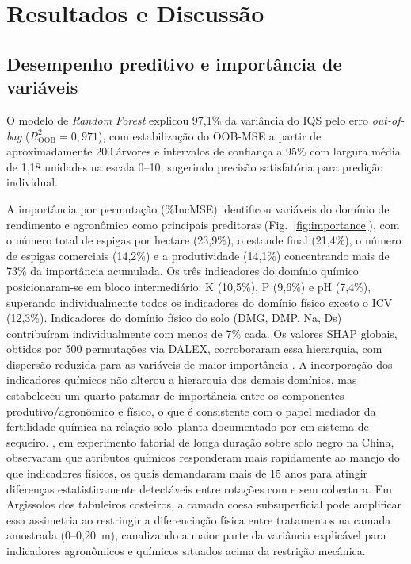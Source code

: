 \documentclass[pdflatex,sn-basic]{sn-jnl}%
\begin{document}
\section{Resultados e Discussão}\label{sec:results_discussion}

\subsection{Desempenho preditivo e importância de variáveis}\label{subsec:performance}

O modelo de \textit{Random Forest} explicou 97,1\% da variância do IQS pelo erro \textit{out-of-bag} ($R^2_{\text{OOB}} = 0{,}971$), com estabilização do OOB-MSE a partir de aproximadamente 200 árvores e intervalos de confiança a 95\% com largura média de 1,18 unidades na escala 0--10, sugerindo precisão satisfatória para predição individual.

A importância por permutação (\%IncMSE) identificou variáveis do domínio de rendimento e agronômico como principais preditoras (Fig.~\ref{fig:importance}), com o número total de espigas por hectare (23,9\%), o estande final (21,4\%), o número de espigas comerciais (14,2\%) e a produtividade (14,1\%) concentrando mais de 73\% da importância acumulada. Os três indicadores do domínio químico posicionaram-se em bloco intermediário: K (10,5\%), P (9,6\%) e pH (7,4\%), superando individualmente todos os indicadores do domínio físico exceto o ICV (12,3\%). Indicadores do domínio físico do solo (DMG, DMP, Na, Ds) contribuíram individualmente com menos de 7\% cada. Os valores SHAP globais, obtidos por 500 permutações via DALEX, corroboraram essa hierarquia, com dispersão reduzida para as variáveis de maior importância \cite{Lundberg2017,Shahriari2023}. A incorporação dos indicadores químicos não alterou a hierarquia dos demais domínios, mas estabeleceu um quarto patamar de importância entre os componentes produtivo/agronômico e físico, o que é consistente com o papel mediador da fertilidade química na relação solo--planta documentado por \cite{Nabiollahi2020} em sistema de sequeiro. \cite{Zhao2022}, em experimento fatorial de longa duração sobre solo negro na China, observaram que atributos químicos responderam mais rapidamente ao manejo do que indicadores físicos, os quais demandaram mais de 15 anos para atingir diferenças estatisticamente detectáveis entre rotações com e sem cobertura. Em Argissolos dos tabuleiros costeiros, a camada coesa subsuperficial pode amplificar essa assimetria ao restringir a diferenciação física entre tratamentos na camada amostrada (0--0,20~m), canalizando a maior parte da variância explicável para indicadores agronômicos e químicos situados acima da restrição mecânica.
\end{document}
